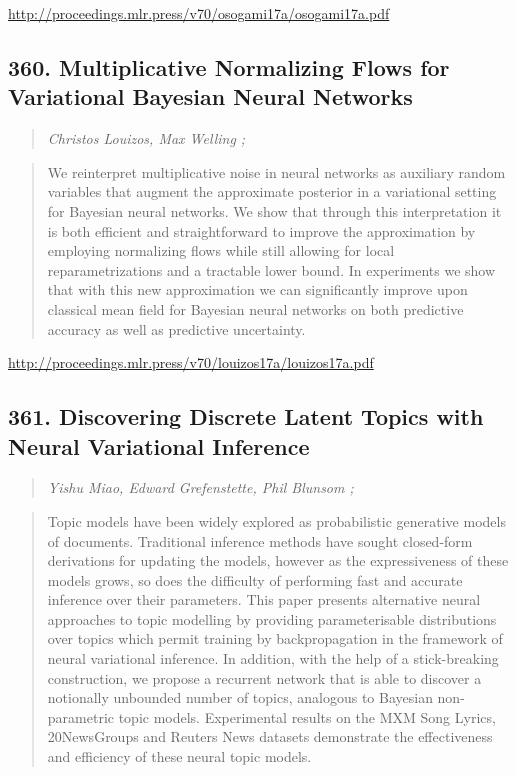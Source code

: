 \documentclass{article}
\begin{document}
\href{http://proceedings.mlr.press/v70/osogami17a/osogami17a.pdf}{http://proceedings.mlr.press/v70/osogami17a/osogami17a.pdf}

\subsection{360. Multiplicative Normalizing Flows for Variational Bayesian Neural Networks}

\begin{quote}
\footnotesize{\textit{Christos Louizos, Max Welling ;}}
\end{quote}

\begin{quote}
    We reinterpret multiplicative noise in neural networks as auxiliary random variables that augment the approximate posterior in a variational setting for Bayesian neural networks. We show that through this interpretation it is both efficient and straightforward to improve the approximation by employing normalizing flows while still allowing for local reparametrizations and a tractable lower bound. In experiments we show that with this new approximation we can significantly improve upon classical mean field for Bayesian neural networks on both predictive accuracy as well as predictive uncertainty.  \end{quote}

\href{http://proceedings.mlr.press/v70/louizos17a/louizos17a.pdf}{http://proceedings.mlr.press/v70/louizos17a/louizos17a.pdf}

\subsection{361. Discovering Discrete Latent Topics with Neural Variational Inference}

\begin{quote}
\footnotesize{\textit{Yishu Miao, Edward Grefenstette, Phil Blunsom ;}}
\end{quote}

\begin{quote}
    Topic models have been widely explored as probabilistic generative models of documents. Traditional inference methods have sought closed-form derivations for updating the models, however as the expressiveness of these models grows, so does the difficulty of performing fast and accurate inference over their parameters. This paper presents alternative neural approaches to topic modelling by providing parameterisable distributions over topics which permit training by backpropagation in the framework of neural variational inference. In addition, with the help of a stick-breaking construction, we propose a recurrent network that is able to discover a notionally unbounded number of topics, analogous to Bayesian non-parametric topic models. Experimental results on the MXM Song Lyrics, 20NewsGroups and Reuters News datasets demonstrate the effectiveness and efficiency of these neural topic models.  \end{quote}
\end{document}
